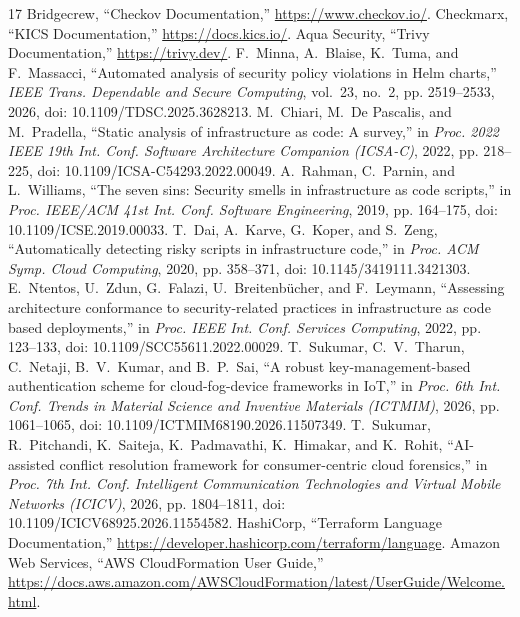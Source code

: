 \documentclass[conference]{IEEEtran}
\begin{document}
\begin{thebibliography}{17}
 Bridgecrew, ``Checkov Documentation,'' \url{https://www.checkov.io/}.
 Checkmarx, ``KICS Documentation,'' \url{https://docs.kics.io/}.
 Aqua Security, ``Trivy Documentation,'' \url{https://trivy.dev/}.
 F.~Minna, A.~Blaise, K.~Tuma, and F.~Massacci, ``Automated analysis of security policy violations in Helm charts,'' \emph{IEEE Trans. Dependable and Secure Computing}, vol.~23, no.~2, pp. 2519--2533, 2026, doi: 10.1109/TDSC.2025.3628213.
 M.~Chiari, M.~De Pascalis, and M.~Pradella, ``Static analysis of infrastructure as code: A survey,'' in \emph{Proc. 2022 IEEE 19th Int. Conf. Software Architecture Companion (ICSA-C)}, 2022, pp. 218--225, doi: 10.1109/ICSA-C54293.2022.00049.
 A.~Rahman, C.~Parnin, and L.~Williams, ``The seven sins: Security smells in infrastructure as code scripts,'' in \emph{Proc. IEEE/ACM 41st Int. Conf. Software Engineering}, 2019, pp. 164--175, doi: 10.1109/ICSE.2019.00033.
 T.~Dai, A.~Karve, G.~Koper, and S.~Zeng, ``Automatically detecting risky scripts in infrastructure code,'' in \emph{Proc. ACM Symp. Cloud Computing}, 2020, pp. 358--371, doi: 10.1145/3419111.3421303.
 E.~Ntentos, U.~Zdun, G.~Falazi, U.~Breitenbücher, and F.~Leymann, ``Assessing architecture conformance to security-related practices in infrastructure as code based deployments,'' in \emph{Proc. IEEE Int. Conf. Services Computing}, 2022, pp. 123--133, doi: 10.1109/SCC55611.2022.00029.
 T.~Sukumar, C.~V.~Tharun, C.~Netaji, B.~V.~Kumar, and B.~P.~Sai, ``A robust key-management-based authentication scheme for cloud-fog-device frameworks in IoT,'' in \emph{Proc. 6th Int. Conf. Trends in Material Science and Inventive Materials (ICTMIM)}, 2026, pp. 1061--1065, doi: 10.1109/ICTMIM68190.2026.11507349.
 T.~Sukumar, R.~Pitchandi, K.~Saiteja, K.~Padmavathi, K.~Himakar, and K.~Rohit, ``AI-assisted conflict resolution framework for consumer-centric cloud forensics,'' in \emph{Proc. 7th Int. Conf. Intelligent Communication Technologies and Virtual Mobile Networks (ICICV)}, 2026, pp. 1804--1811, doi: 10.1109/ICICV68925.2026.11554582.
 HashiCorp, ``Terraform Language Documentation,'' \url{https://developer.hashicorp.com/terraform/language}.
 Amazon Web Services, ``AWS CloudFormation User Guide,'' \url{https://docs.aws.amazon.com/AWSCloudFormation/latest/UserGuide/Welcome.html}.

\end{thebibliography}
\end{document}

